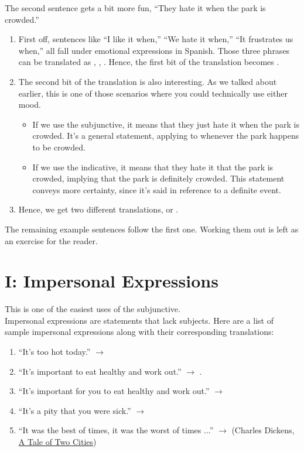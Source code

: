 The second sentence gets a bit more fun, ``They hate it when the park is crowded.''
\begin{enumerate}
	\item First off, sentences like ``I like it when,'' ``We hate it when,'' ``It frustrates us when,'' all fall under emotional expressions in Spanish. Those three phrases can be translated as , , . Hence, the first bit of the translation becomes .
	\item The second bit of the translation is also interesting. As we talked about earlier, this is one of those scenarios where you could technically use either mood. 
		\begin{itemize}
			\item If we use the subjunctive, it means that they just hate it when the park is crowded. It's a general statement, applying to whenever the park happens to be crowded. 
			\item If we use the indicative, it means that they hate it that the park is crowded, implying that the park is definitely crowded. This statement conveys more certainty, since it's said in reference to a definite event. 
		\end{itemize}
	\item Hence, we get two different translations,  or . 
\end{enumerate}

The remaining example sentences follow the first one. Working them out is left as an exercise for the reader. 
\section{I: Impersonal Expressions}
This is one of the easiest uses of the subjunctive. \\

Impersonal expressions are statements that lack subjects. Here are a list of sample impersonal expressions along with their corresponding translations:
\begin{enumerate}[noitemsep]
	\item ``It's too hot today.'' $\rightarrow$ 
	\item ``It's important to eat healthy and work out.'' $\rightarrow$ .
	\item ``It's important for you to eat healthy and work out.'' $\rightarrow$ 
	\item ``It's a pity that you were sick.'' $\rightarrow$ 
	\item ``It was the best of times, it was the worst of times ...'' $\rightarrow$  (Charles Dickens, \underline{A Tale of Two Cities})
\end{enumerate}


